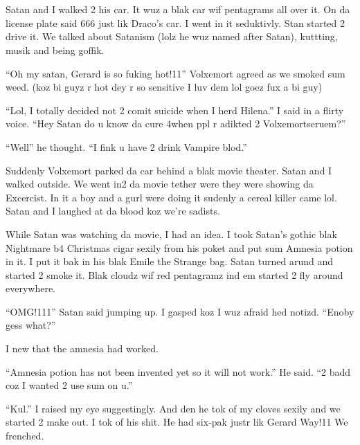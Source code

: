 \section{}



Satan and I walked 2 his car. It wuz a blak car wif pentagrams all over it. On da license plate said 666 just lik Draco's car. I went in it seduktivly. Stan started 2 drive it. We talked about Satanism (lolz he wuz named after Satan), kuttting, musik and being goffik.

\enquote{Oh my satan, Gerard is so fuking hot!11} Volxemort agreed as we smoked sum weed. (koz bi guyz r hot dey r so sensitive I luv dem lol goez fux a bi guy)

\enquote{Lol, I totally decided not 2 comit suicide when I herd Hilena.} I said in a flirty voice. \enquote{\dotfill Hey Satan do u know da cure 4\newline when ppl r adikted 2 Volxemortseruem?}

\enquote{Well\dotfill} he thought. \enquote{I fink u have 2 drink Vampire blod.}

Suddenly Volxemort parked da car behind a blak movie theater. Satan and I walked outside. We went in2 da movie tether were they were showing da Excercist. In it a boy and a gurl were doing it sudenly a cereal killer came lol. Satan and I laughed at da blood koz we're sadists.

While Satan was watching da movie, I had an idea. I took Satan's gothic blak Nightmare b4 Christmas cigar sexily from his poket and put sum Amnesia potion in it. I put it bak in his blak Emile the Strange bag. Satan turned arund and started 2 smoke it. Blak cloudz wif red pentagramz ind em started 2 fly around everywhere.

\enquote{OMG!111} Satan said jumping up. I gasped koz I wuz afraid hed notizd. \enquote{Enoby gess what?}

I new that the amnesia had worked.

\enquote{Amnesia potion has not been invented yet so it will not work.} He said. \enquote{2 badd coz I wanted 2 use sum on u.}

\enquote{Kul.} I raised my eye suggestingly. And den\dotfill\newline
he tok of my cloves sexily and we started 2 make out. I tok of his shit. He had six-pak justr lik Gerard Way!11 We frenched.

